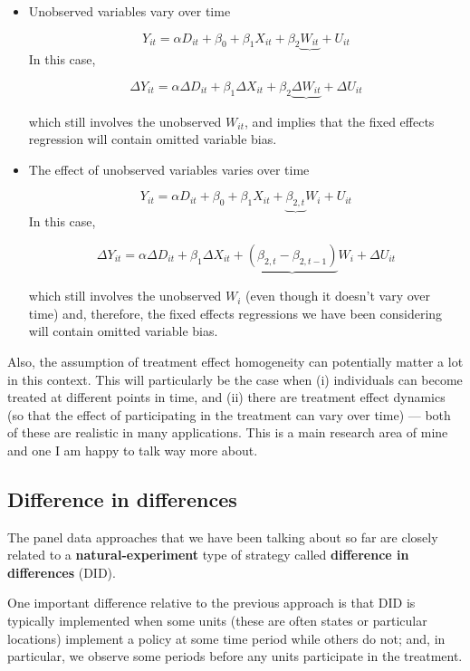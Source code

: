 \documentclass[
  letterpaper,
  DIV=11,
  numbers=noendperiod]{scrreprt}
\begin{document}
\begin{itemize}
\item
  Unobserved variables vary over time

  \[
      Y_{it} = \alpha D_{it} + \beta_0 + \beta_1 X_{it} + \beta_2 \underbrace{W_{it}} + U_{it}
    \] In this case,

  \[
      \Delta Y_{it} = \alpha \Delta D_{it} + \beta_1 \Delta X_{it} + \beta_2 \underbrace{\Delta W_{it}} + \Delta U_{it}
    \]

  which still involves the unobserved \(W_{it}\), and implies that the
  fixed effects regression will contain omitted variable bias.
\item
  The effect of unobserved variables varies over time

  \[
      Y_{it} = \alpha D_{it} + \beta_0 + \beta_1 X_{it} + \underbrace{\beta_{2,t}} W_i + U_{it}
    \] In this case,

  \[
      \Delta Y_{it} = \alpha \Delta D_{it} + \beta_1 \Delta X_{it} + \underbrace{(\beta_{2,t} - \beta_{2,t-1})} W_i + \Delta U_{it}
    \]

  which still involves the unobserved \(W_i\) (even though it doesn't
  vary over time) and, therefore, the fixed effects regressions we have
  been considering will contain omitted variable bias.
\end{itemize}

Also, the assumption of treatment effect homogeneity can potentially
matter a lot in this context. This will particularly be the case when
(i) individuals can become treated at different points in time, and (ii)
there are treatment effect dynamics (so that the effect of participating
in the treatment can vary over time) --- both of these are realistic in
many applications. This is a main research area of mine and one I am
happy to talk way more about.

\subsection{Difference in differences}\label{difference-in-differences}

The panel data approaches that we have been talking about so far are
closely related to a \textbf{natural-experiment} type of strategy called
\textbf{difference in differences} (DID).

One important difference relative to the previous approach is that DID
is typically implemented when some units (these are often states or
particular locations) implement a policy at some time period while
others do not; and, in particular, we observe some periods before any
units participate in the treatment.
\end{document}
